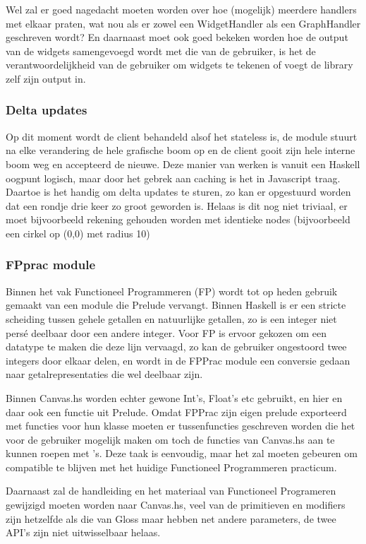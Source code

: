 Wel zal er goed nagedacht moeten worden over hoe (mogelijk) meerdere handlers met elkaar praten, wat nou als er zowel een WidgetHandler als een GraphHandler geschreven wordt? En daarnaast moet ook goed bekeken worden hoe de output van de widgets samengevoegd wordt met die van de gebruiker, is het de verantwoordelijkheid van de gebruiker om widgets te tekenen of voegt de library zelf zijn output in.

\subsubsection{Delta updates} \label{subsub:deltas}
Op dit moment wordt de client behandeld alsof het stateless is, de module stuurt na elke verandering de hele grafische boom op en de client gooit zijn hele interne boom weg en accepteerd de nieuwe. Deze manier van werken is vanuit een Haskell oogpunt logisch, maar door het gebrek aan caching is het in Javascript traag. Daartoe is het handig om delta updates te sturen, zo kan er opgestuurd worden dat een rondje drie keer zo groot geworden is. Helaas is dit nog niet triviaal, er moet bijvoorbeeld rekening gehouden worden met identieke nodes (bijvoorbeeld een cirkel op (0,0) met radius 10)

\subsubsection{FPprac module}
Binnen het vak Functioneel Programmeren (FP) wordt tot op heden gebruik gemaakt van een module die Prelude vervangt. Binnen Haskell is er een stricte scheiding tussen gehele getallen en natuurlijke getallen, zo is een integer niet persé deelbaar door een andere integer. Voor FP is ervoor gekozen om een  datatype te maken die deze lijn vervaagd, zo kan de gebruiker ongestoord twee integers door elkaar delen, en wordt in de FPPrac module een conversie gedaan naar getalrepresentaties die wel deelbaar zijn.

Binnen Canvas.hs worden echter gewone Int's, Float's etc gebruikt, en hier en daar ook een functie uit Prelude. Omdat FPPrac zijn eigen prelude exporteerd met functies voor hun  klasse moeten er tussenfuncties geschreven worden die het voor de gebruiker mogelijk maken om toch de functies van Canvas.hs aan te kunnen roepen met 's. Deze taak is eenvoudig, maar het zal moeten gebeuren om compatible te blijven met het huidige Functioneel Programmeren practicum.

Daarnaast zal de handleiding en het materiaal van Functioneel Programeren gewijzigd moeten worden naar Canvas.hs, veel van de primitieven en modifiers zijn hetzelfde als die van Gloss maar hebben net andere parameters, de twee API's zijn niet uitwisselbaar helaas.
